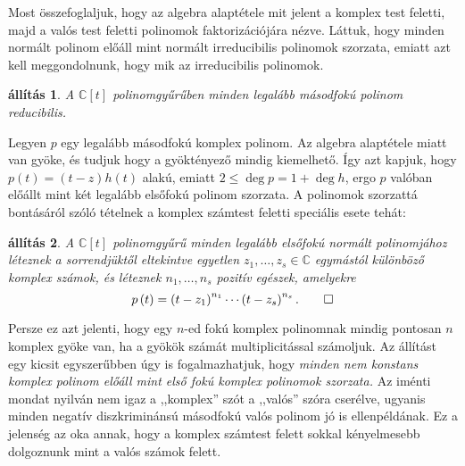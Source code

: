 \documentclass[9pt, a4paper, showtrims]{memoir}
\makeatletter
\renewenvironment{proof}[1][\proofname]
    {\par\pushQED{\qed}%
    \normalfont \topsep6\p@\@plus6\p@\relax
    \trivlist
    \item[\hskip\labelsep
        \itshape
    #1\@addpunct{:}]\ignorespaces}
    {\popQED\endtrivlist\@endpefalse}
\theoremstyle{plain}
\newtheorem{proposition}{állítás}[chapter]
\theoremstyle{remark}
\theoremstyle{definition}
\makeatother
\begin{document}
Most összefoglaljuk, hogy az algebra alaptétele mit jelent a komplex test feletti, majd a valós test feletti polinomok
faktorizációjára nézve.
Láttuk, hogy minden normált polinom előáll mint normált irreducibilis polinomok szorzata,
emiatt azt kell meggondolnunk, hogy mik az irreducibilis polinomok.
\begin{proposition}
    A $\mathbb{C}\left[ t \right]$ polinomgyűrűben minden legalább másodfokú polinom reducibilis.
\end{proposition}
\begin{proof}
    Legyen $p$ egy legalább másodfokú komplex polinom.
    Az algebra alaptétele miatt van gyöke, és
    tudjuk hogy a gyöktényező mindig kiemelhető.
    Így azt kapjuk, hogy $p(t)=\left( t-z \right)h\left( t \right)$ alakú,
    emiatt $2\leq\deg p=1+\deg h$, ergo
    $p$ valóban előállt mint két legalább elsőfokú polinom szorzata.
\end{proof}
A polinomok szorzattá bontásáról szóló tételnek a komplex számtest feletti speciális esete tehát:
\begin{proposition}\label{pr:PolFact}
    A $\mathbb{C}[t]$ polinomgyűrű minden legalább elsőfokú normált polinomjához léteznek
    a sorrendjüktől eltekintve egyetlen $z_1,\dots,z_s\in\mathbb{C}$ egymástól különböző komplex számok,
    és léteznek $n_1,\dots,n_s$ pozitív egészek, 
    amelyekre
    \[
        p\left( t \right)=
        \left( t-z_1 \right)^{n_1}
        \cdots
        \left( t-z_s\right)^{n_s}.\qedhere
    \]
\end{proposition}
Persze ez azt jelenti, hogy egy $n$-ed fokú komplex polinomnak mindig pontosan $n$ komplex gyöke van, 
ha a gyökök számát multiplicitással számoljuk.
Az állítást egy kicsit egyszerűbben úgy is fogalmazhatjuk, 
hogy 
\emph{
    minden nem konstans komplex polinom előáll mint első fokú komplex polinomok szorzata.
}
Az iménti mondat nyilván nem igaz a ,,komplex'' szót a ,,valós'' szóra cserélve, 
ugyanis minden negatív diszkriminánsú másodfokú valós polinom jó is ellenpéldának.
Ez a jelenség az oka annak, 
hogy a komplex számtest felett sokkal kényelmesebb dolgoznunk mint a valós számok felett.
\end{document}
